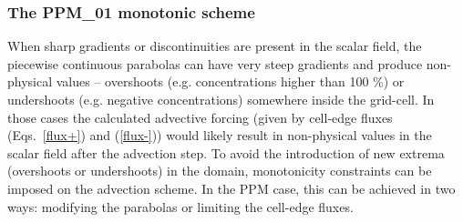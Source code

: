   \subsubsection{The PPM\_01 monotonic scheme}  

  When sharp gradients or discontinuities are present in the scalar
  field, the piecewise continuous parabolas can have very steep
  gradients and produce non-physical values -- overshoots
  (e.g. concentrations higher than 100 \%) or undershoots (e.g. negative
  concentrations) somewhere inside the grid-cell. In those cases the
  calculated advective forcing (given by cell-edge fluxes (Eqs.~\ref{flux+})
  and (\ref{flux-})) would likely result in non-physical values in the
  scalar field after the advection step. To avoid the introduction of
  new extrema (overshoots or undershoots) in the domain, monotonicity
  constraints can be imposed on the advection scheme. In the PPM case,
  this can be achieved in two ways: modifying the parabolas or limiting
  the cell-edge fluxes.

